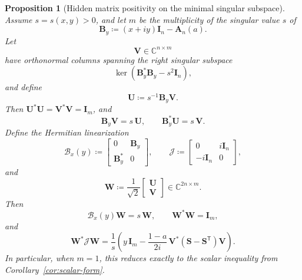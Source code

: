 \documentclass[11pt]{article}
\newtheorem{proposition}[theorem]{Proposition}
\begin{document}
\begin{proposition}[Hidden matrix positivity on the minimal singular subspace]\label{prop:hidden-matrix-positivity}
Assume \(s=s(x,y)>0\), and let \(m\) be the multiplicity of the singular value \(s\) of
\[
\mathbf B_y\coloneqq (x+iy)\mathbf I_n-\mathbf A_n(a).
\]
Let
\[
\mathbf V\in\mathbb C^{n\times m}
\]
have orthonormal columns spanning the right singular subspace
\[
\ker(\mathbf B_y^*\mathbf B_y-s^2\mathbf I_n),
\]
and define
\[
\mathbf U\coloneqq s^{-1}\mathbf B_y\mathbf V.
\]
Then \(\mathbf U^*\mathbf U=\mathbf V^*\mathbf V=\mathbf I_m\), and
\[
\mathbf B_y\mathbf V=s\,\mathbf U,
\qquad
\mathbf B_y^*\mathbf U=s\,\mathbf V.
\]
Define the Hermitian linearization
\[
\mathcal B_x(y)\coloneqq
\begin{bmatrix}
0 & \mathbf B_y\\
\mathbf B_y^* & 0
\end{bmatrix},
\qquad
\mathcal J\coloneqq
\begin{bmatrix}
0 & i\mathbf I_n\\
-i\mathbf I_n & 0
\end{bmatrix},
\]
and
\[
\mathbf W\coloneqq \frac{1}{\sqrt2}\begin{bmatrix}\mathbf U\\[1mm]\mathbf V\end{bmatrix}\in\mathbb C^{2n\times m}.
\]
Then
\[
\mathcal B_x(y)\mathbf W=s\,\mathbf W,
\qquad
\mathbf W^*\mathbf W=\mathbf I_m,
\]
and
\[
\boxed{
\mathbf W^*\mathcal J\mathbf W
=
\frac1s
\left(
y\,\mathbf I_m
-
\frac{1-a}{2i}\,\mathbf V^*(\mathbf S-\mathbf S^{\mathsf T})\mathbf V
\right).
}
\]
In particular, when \(m=1\), this reduces exactly to the scalar inequality from Corollary~\ref{cor:scalar-form}.
\end{proposition}
\end{document}
